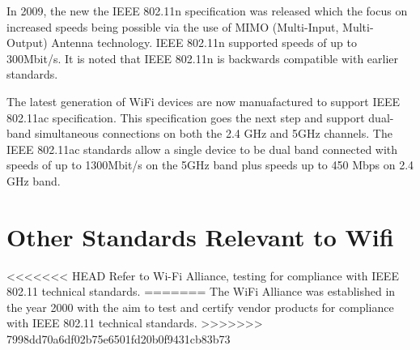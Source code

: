 In 2009, the new the IEEE 802.11n specification was released which the focus on increased speeds being possible via the use of MIMO (Multi-Input, Multi-Output) Antenna technology. IEEE 802.11n supported speeds of up to 300Mbit/s. It is noted that IEEE 802.11n is backwards compatible with earlier standards.

The latest generation of WiFi devices are now manuafactured to support IEEE 802.11ac specification.  This specification goes the next step and support dual-band simultaneous connections on both the 2.4 GHz and 5GHz channels. The IEEE 802.11ac standards allow a single device to be dual band connected with speeds of up to 1300Mbit/s on the 5GHz band plus speeds up to 450 Mbps on 2.4 GHz band.



\section{Other Standards Relevant to Wifi}

<<<<<<< HEAD
Refer to Wi-Fi Alliance, testing for compliance with IEEE 802.11 technical standards.
=======
The WiFi Alliance was established in the year 2000 with the aim to test and certify vendor products for compliance with IEEE 802.11 technical standards.
>>>>>>> 7998dd70a6df02b75e6501fd20b0f9431cb83b73
